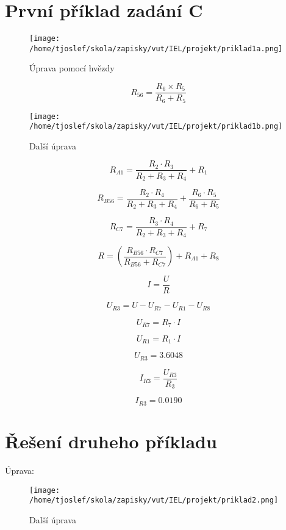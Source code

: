 \documentclass{article}
\begin{document}
\sloppy

\section{První příklad zadání C}

\begin{figure}[!ht]
  \centering
  \texttt{[image: /home/tjoslef/skola/zapisky/vut/IEL/projekt/priklad1a.png]}
  \caption{Úprava pomocí hvězdy}
  \label{fig:hvezda}
\end{figure}

\[
    R_{56} = \frac{R_6 \times R_5}{R_6 + R_5}
\]

\begin{figure}[!ht]
  \centering
  \texttt{[image: /home/tjoslef/skola/zapisky/vut/IEL/projekt/priklad1b.png]}
  \caption{Další úprava}
  \label{fig:dalsi_uprava}
\end{figure}


\[
R_{A1} = \frac{R_2 \cdot R_3}{R_2 + R_3 + R_4} + R_1
\]

\[
R_{B56} = \frac{R_2 \cdot R_4}{R_2 + R_3 + R_4} + \frac{R_6 \cdot R_5}{R_6 + R_5}
\]

\[
R_{C7} = \frac{R_3 \cdot R_4}{R_2 + R_3 + R_4} + R_7
\]

\[
R = \left(\frac{R_{B56} \cdot R_{C7}}{R_{B56} + R_{C7}}\right) + R_{A1} + R_8
\]

\[
I = \frac{U}{R}
\]

\[
U_{R3} = U - U_{R7} - U_{R1} - U_{R8}
\]

\[
U_{R7} = R_7 \cdot I
\]

\[
U_{R1} = R_1 \cdot I
\]

\[
U_{R3} = 3.6048
\]

\[
I_{R3} = \frac{U_{R3}}{R_3}
\]

\[
I_{R3} = 0.0190
\]
\clearpage
\section{Řešení druheho příkladu}
Úprava:

\begin{figure}[!ht]
  \centering
  \texttt{[image: /home/tjoslef/skola/zapisky/vut/IEL/projekt/priklad2.png]}
  \caption{Další úprava}
  \label{fig:upravapriklad2}
\end{figure}
\end{document}
